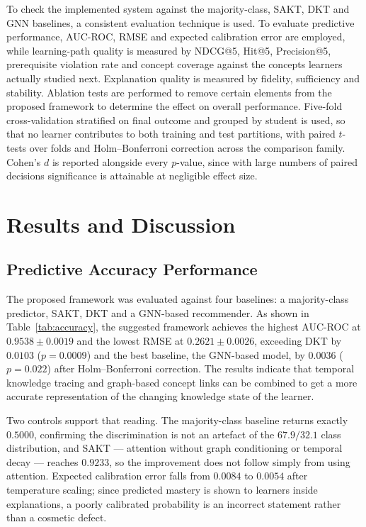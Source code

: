 To check the implemented system against the majority-class, SAKT, DKT and GNN baselines, a
consistent evaluation technique is used. To evaluate predictive performance, AUC-ROC, RMSE
and expected calibration error are employed, while learning-path quality is measured by
NDCG@5, Hit@5, Precision@5, prerequisite violation rate and concept coverage against the
concepts learners actually studied next. Explanation quality is measured by fidelity,
sufficiency and stability. Ablation tests are performed to remove certain elements from
the proposed framework to determine the effect on overall performance. Five-fold cross-validation stratified on final outcome and grouped by
student is used, so that no learner contributes to both training and test partitions, with
paired $t$-tests over folds and Holm--Bonferroni correction \cite{holm1979} across the
comparison family. Cohen's $d$ is reported alongside every $p$-value, since with large
numbers of paired decisions significance is attainable at negligible effect size.

\section{Results and Discussion}
\label{sec:results}

\subsection{Predictive Accuracy Performance}

The proposed framework was evaluated against four baselines: a majority-class predictor,
SAKT, DKT and a GNN-based recommender. As shown in Table~\ref{tab:accuracy}, the suggested
framework achieves the highest AUC-ROC at $0.9538 \pm 0.0019$ and the lowest RMSE at
$0.2621 \pm 0.0026$, exceeding DKT by $0.0103$ ($p = 0.0009$) and the best baseline, the
GNN-based model, by $0.0036$ ($p = 0.022$) after Holm--Bonferroni correction. The results
indicate that temporal knowledge tracing and graph-based concept links can be combined to
get a more accurate representation of the changing knowledge state of the learner.

Two controls support that reading. The majority-class baseline returns exactly $0.5000$,
confirming the discrimination is not an artefact of the $67.9/32.1$ class distribution,
and SAKT --- attention without graph conditioning or temporal decay --- reaches $0.9233$,
so the improvement does not follow simply from using attention. Expected calibration error
falls from $0.0084$ to $0.0054$ after temperature scaling; since predicted mastery is
shown to learners inside explanations, a poorly calibrated probability is an incorrect
statement rather than a cosmetic defect.

